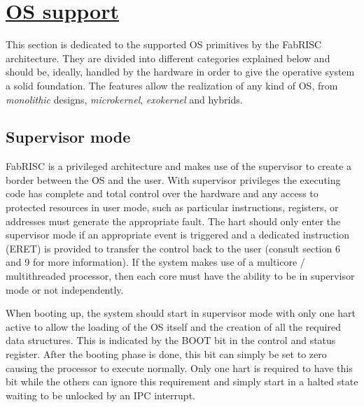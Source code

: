\section[OS support]{\LARGE\underline{OS support}}

    \vspace{10pt}

    This section is dedicated to the supported OS primitives by the FabRISC architecture. They are divided into different categories explained below and should be, ideally, handled by the hardware in order to give the operative system a solid foundation. The features allow the realization of any kind of OS, from \textit{monolithic} designs, \textit{microkernel}, \textit{exokernel} and hybrids.

    \subsection{Supervisor mode}

        \vspace{10pt}

        FabRISC is a privileged architecture and makes use of the supervisor to create a border between the OS and the user. With supervisor privileges the executing code has complete and total control over the hardware and any access to protected resources in user mode, such as particular instructions, registers, or addresses must generate the appropriate fault. The hart should only enter the supervisor mode if an appropriate event is triggered and a dedicated instruction (ERET) is provided to transfer the control back to the user (consult section 6 and 9 for more information). If the system makes use of a multicore / multithreaded processor, then each core must have the ability to be in supervisor mode or not independently.

        \vspace{10pt}

        When booting up, the system should start in supervisor mode with only one hart active to allow the loading of the OS itself and the creation of all the required data structures. This is indicated by the BOOT bit in the control and status register. After the booting phase is done, this bit can simply be set to zero causing the processor to execute normally. Only one hart is required to have this bit while the others can ignore this requirement and simply start in a halted state waiting to be unlocked by an IPC interrupt. %

